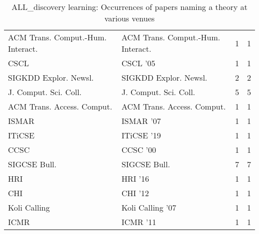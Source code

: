 \begin{table*}[t]
\begin{tabular}{llrr}
\multirow{1}{*}{ACM Trans. Comput.-Hum. Interact.} & ACM Trans. Comput.-Hum. Interact. & 1 & \multirow{1}{*}{1}\\
\multirow{1}{*}{CSCL } & CSCL '05 & 1 & \multirow{1}{*}{1}\\
\multirow{1}{*}{SIGKDD Explor. Newsl.} & SIGKDD Explor. Newsl. & 2 & \multirow{1}{*}{2}\\
\multirow{1}{*}{J. Comput. Sci. Coll.} & J. Comput. Sci. Coll. & 5 & \multirow{1}{*}{5}\\
\multirow{1}{*}{ACM Trans. Access. Comput.} & ACM Trans. Access. Comput. & 1 & \multirow{1}{*}{1}\\
\multirow{1}{*}{ISMAR } & ISMAR '07 & 1 & \multirow{1}{*}{1}\\
\multirow{1}{*}{ITiCSE } & ITiCSE '19 & 1 & \multirow{1}{*}{1}\\
\multirow{1}{*}{CCSC } & CCSC '00 & 1 & \multirow{1}{*}{1}\\
\multirow{1}{*}{SIGCSE Bull.} & SIGCSE Bull. & 7 & \multirow{1}{*}{7}\\
\multirow{1}{*}{HRI } & HRI '16 & 1 & \multirow{1}{*}{1}\\
\multirow{1}{*}{CHI } & CHI '12 & 1 & \multirow{1}{*}{1}\\
\multirow{1}{*}{Koli Calling } & Koli Calling '07 & 1 & \multirow{1}{*}{1}\\
\multirow{1}{*}{ICMR } & ICMR '11 & 1 & \multirow{1}{*}{1}\\
\end{tabular}
\caption{ALL\_discovery learning: Occurrences of papers naming a theory at various venues}
\end{table*}